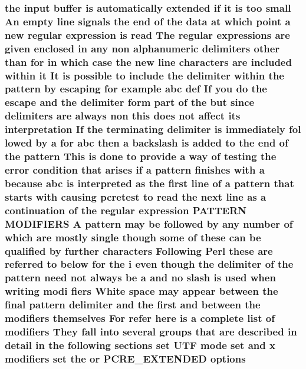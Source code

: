 \subsubsection[{\texorpdfstring{options}{options}}]{\setlength{\rightskip}{0pt plus 5cm}the {\bf input} {\bf buffer} {\bf is} automatically extended {\bf if} {\bf it} {\bf is} too small An {\bf empty} {\bf line} signals the {\bf end} {\bf of} the {\bf data} at {\bf which} {\bf point} {\bf a} new regular {\bf expression} {\bf is} {\bf read} The regular {\bf expressions} {\bf are} {\bf given} enclosed {\bf in} {\bf any} non {\bf alphanumeric} delimiters other {\bf than} for {\bf in} {\bf which} {\bf case} the new {\bf line} {\bf characters} {\bf are} {\bf included} within {\bf it} It {\bf is} {\bf possible} {\bf to} {\bf include} the delimiter within the {\bf pattern} by escaping for {\bf example} {\bf abc} def If you {\bf do} the escape and the delimiter form part {\bf of} the but since delimiters {\bf are} always non {\bf this} does {\bf not} affect its interpretation If the terminating delimiter {\bf is} immediately fol lowed by {\bf a} for {\bf abc} then {\bf a} {\bf backslash} {\bf is} added {\bf to} the {\bf end} {\bf of} the {\bf pattern} This {\bf is} {\bf done} {\bf to} provide {\bf a} {\bf way} {\bf of} testing the {\bf error} condition that {\bf arises} {\bf if} {\bf a} {\bf pattern} finishes {\bf with} {\bf a} because {\bf abc} {\bf is} interpreted {\bf as} the {\bf first} {\bf line} {\bf of} {\bf a} {\bf pattern} that starts {\bf with} causing {\bf pcretest} {\bf to} {\bf read} the next {\bf line} {\bf as} {\bf a} continuation {\bf of} the regular {\bf expression} P\+A\+T\+T\+E\+RN M\+O\+D\+I\+F\+I\+E\+RS {\bf A} {\bf pattern} may {\bf be} followed by {\bf any} {\bf number} {\bf of} {\bf which} {\bf are} mostly single {\bf though} some {\bf of} these {\bf can} {\bf be} qualified by further {\bf characters} Following {\bf Perl} these {\bf are} referred {\bf to} {\bf below} for the {\bf i} even {\bf though} the delimiter {\bf of} the {\bf pattern} need {\bf not} always {\bf be} {\bf a} and no {\bf slash} {\bf is} {\bf used} when writing modi fiers White {\bf space} may appear between the final {\bf pattern} delimiter and the {\bf first} and between the {\bf modifiers} {\bf themselves} For refer {\bf here} {\bf is} {\bf a} complete {\bf list} {\bf of} {\bf modifiers} They fall into several groups that {\bf are} described {\bf in} detail {\bf in} the following sections {\bf set} U\+TF {\bf mode} {\bf set} and {\bf x} {\bf modifiers} {\bf set} the {\bf or} {\bf P\+C\+R\+E\+\_\+\+E\+X\+T\+E\+N\+D\+ED} options}\hypertarget{pcretest_8txt_aa6c9d809037676d22aceaf5517a33faf}{}\label{pcretest_8txt_aa6c9d809037676d22aceaf5517a33faf}
